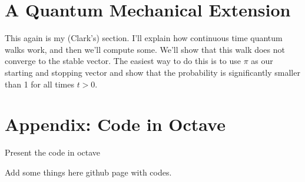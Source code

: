 \documentclass{article}
\theoremstyle{definition}
\theoremstyle{remark}
\numberwithin{equation}{section}
\begin{document}
\section{A Quantum Mechanical Extension}

This again is my (Clark's) section.  I'll 
explain how continuous time quantum walks work, and then we'll compute some.  We'll show that this walk does not converge to the stable vector.  The easiest way to do this is to use $\pi$ as our starting and stopping vector and show that the probability is significantly smaller than 1 for all times $t>0$.

\section*{Appendix: Code in Octave}

Present the code in octave

\begin{thebibliography}{99}
 Add some things here
 github page with codes.
\end{thebibliography}
\end{document}
